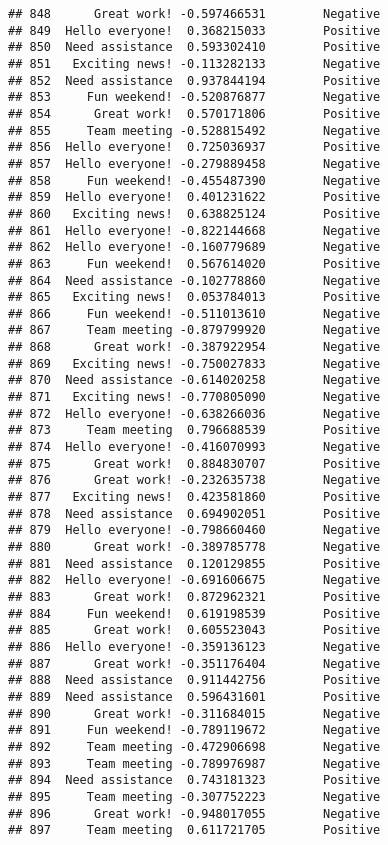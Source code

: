 \documentclass[
]{article}
\begin{document}
\begin{verbatim}
## 848      Great work! -0.597466531        Negative
## 849  Hello everyone!  0.368215033        Positive
## 850  Need assistance  0.593302410        Positive
## 851   Exciting news! -0.113282133        Negative
## 852  Need assistance  0.937844194        Positive
## 853     Fun weekend! -0.520876877        Negative
## 854      Great work!  0.570171806        Positive
## 855     Team meeting -0.528815492        Negative
## 856  Hello everyone!  0.725036937        Positive
## 857  Hello everyone! -0.279889458        Negative
## 858     Fun weekend! -0.455487390        Negative
## 859  Hello everyone!  0.401231622        Positive
## 860   Exciting news!  0.638825124        Positive
## 861  Hello everyone! -0.822144668        Negative
## 862  Hello everyone! -0.160779689        Negative
## 863     Fun weekend!  0.567614020        Positive
## 864  Need assistance -0.102778860        Negative
## 865   Exciting news!  0.053784013        Positive
## 866     Fun weekend! -0.511013610        Negative
## 867     Team meeting -0.879799920        Negative
## 868      Great work! -0.387922954        Negative
## 869   Exciting news! -0.750027833        Negative
## 870  Need assistance -0.614020258        Negative
## 871   Exciting news! -0.770805090        Negative
## 872  Hello everyone! -0.638266036        Negative
## 873     Team meeting  0.796688539        Positive
## 874  Hello everyone! -0.416070993        Negative
## 875      Great work!  0.884830707        Positive
## 876      Great work! -0.232635738        Negative
## 877   Exciting news!  0.423581860        Positive
## 878  Need assistance  0.694902051        Positive
## 879  Hello everyone! -0.798660460        Negative
## 880      Great work! -0.389785778        Negative
## 881  Need assistance  0.120129855        Positive
## 882  Hello everyone! -0.691606675        Negative
## 883      Great work!  0.872962321        Positive
## 884     Fun weekend!  0.619198539        Positive
## 885      Great work!  0.605523043        Positive
## 886  Hello everyone! -0.359136123        Negative
## 887      Great work! -0.351176404        Negative
## 888  Need assistance  0.911442756        Positive
## 889  Need assistance  0.596431601        Positive
## 890      Great work! -0.311684015        Negative
## 891     Fun weekend! -0.789119672        Negative
## 892     Team meeting -0.472906698        Negative
## 893     Team meeting -0.789976987        Negative
## 894  Need assistance  0.743181323        Positive
## 895     Team meeting -0.307752223        Negative
## 896      Great work! -0.948017055        Negative
## 897     Team meeting  0.611721705        Positive

\end{verbatim}
\end{document}
